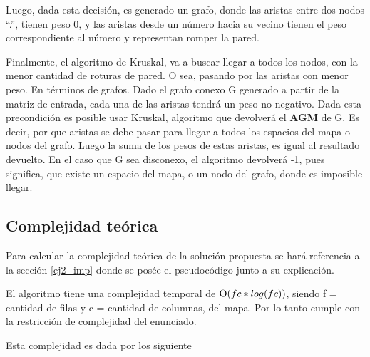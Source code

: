 	Luego, dada esta decisión, es generado un grafo, donde las aristas entre dos nodos “.”, tienen peso 0, y las aristas desde un número hacia su vecino tienen el peso correspondiente al número y representan romper la pared.

	Finalmente, el algoritmo de Kruskal, va a buscar llegar a todos los nodos, con la menor cantidad de roturas de pared. O sea, pasando por las aristas con menor peso. En términos de grafos. Dado el grafo conexo G generado a partir de la matriz de entrada, cada una de las aristas tendrá un peso no negativo. Dada esta precondición es posible usar Kruskal, algoritmo que devolverá el \textbf{AGM} de G. Es decir, por que aristas se debe pasar para llegar a todos los espacios del mapa o nodos del grafo. Luego la suma de los pesos de estas aristas, es igual al resultado devuelto. En el caso que G sea disconexo, el algoritmo devolverá -1, pues significa, que existe un espacio del mapa, o un nodo del grafo, donde es imposible llegar.


	\subsection{Complejidad teórica}

	Para calcular la complejidad teórica de la solución propuesta se hará
	referencia a la sección \ref{ej2_imp} donde se posée el pseudocódigo junto a
	su explicación.

	El algoritmo tiene una complejidad temporal de $\operatorname{O}(fc*log(fc))$, siendo f = cantidad de filas y c = cantidad de columnas, del mapa.
	Por lo tanto cumple con la restricción de complejidad del enunciado. \par

	Esta complejidad es dada por los siguiente

